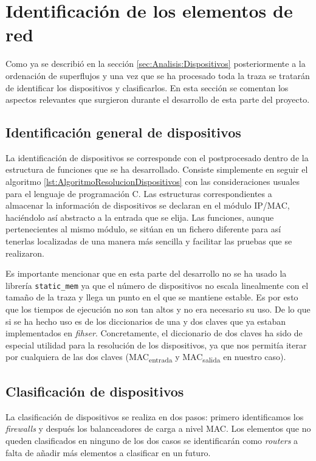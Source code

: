 \documentclass[tfg,epsbased,lof,lot,loa,covers,final,copyright,overleaf]{tfgtfmthesisuam}
\begin{document}
\section{Identificación de los elementos de red}
Como ya se describió en la sección \ref{sec:Analisis:Dispositivos} posteriormente a la ordenación de superflujos y una vez que se ha procesado toda la traza se tratarán de identificar los dispositivos y clasificarlos. En esta sección se comentan los aspectos relevantes que surgieron durante el desarrollo de esta parte del proyecto.

\subsection{Identificación general de dispositivos}
La identificación de dispositivos se corresponde con el postprocesado dentro de la estructura de funciones que se ha desarrollado. Consiste simplemente en seguir el algoritmo \ref{lst:AlgoritmoResolucionDispositivos} con las consideraciones usuales para el lenguaje de programación C. Las estructuras correspondientes a almacenar la información de dispositivos se declaran en el módulo IP/MAC, haciéndolo así abstracto a la entrada que se elija. Las funciones, aunque pertenecientes al mismo módulo, se sitúan en un fichero diferente para así tenerlas localizadas de una manera más sencilla y facilitar las pruebas que se realizaron.

Es importante mencionar que en esta parte del desarrollo no se ha usado la librería \texttt{static\_mem} ya que el número de dispositivos no escala linealmente con el tamaño de la traza y llega un punto en el que se mantiene estable. Es por esto que los tiempos de ejecución no son tan altos y no era necesario su uso. De lo que si se ha hecho uso es de los diccionarios de una y dos claves que ya estaban implementados en \textit{fihser}. Concretamente, el diccionario de dos claves ha sido de especial utilidad para la resolución de los dispositivos, ya que nos permitía iterar por cualquiera de las dos claves (MAC\textsubscript{entrada} y MAC\textsubscript{salida} en nuestro caso).

\subsection{Clasificación de dispositivos}
La clasificación de dispositivos se realiza en dos pasos: primero identificamos los \textit{firewalls} y después los balanceadores de carga a nivel MAC. Los elementos que no queden clasificados en ninguno de los dos casos se identificarán como \textit{routers} a falta de añadir más elementos a clasificar en un futuro.
\end{document}
